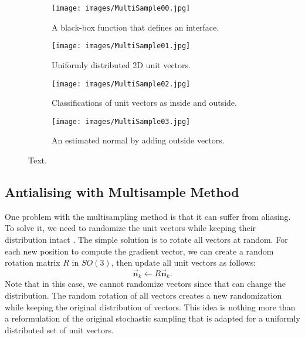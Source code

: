 \documentclass{article}
\begin{document}
\begin{figure}
        \begin{subfigure}[t]{0.23\textwidth}
        \texttt{[image: images/MultiSample00.jpg]}
        \caption{A black-box function that defines an interface. }
        \label{fig_MultiSample00}
    \end{subfigure}
    \hfill
        \begin{subfigure}[t]{0.23\textwidth}
        \texttt{[image: images/MultiSample01.jpg]}
        \caption{Uniformly distributed 2D unit vectors. }
        \label{fig_MultiSample01}
    \end{subfigure}
    \hfill
    \begin{subfigure}[t]{0.23\textwidth}
        \texttt{[image: images/MultiSample02.jpg]}
        \caption{Classifications of unit vectors as inside and outside. }
        \label{fig_MultiSample02}
    \end{subfigure}
    \hfill
        \begin{subfigure}[t]{0.23\textwidth}
        \texttt{[image: images/MultiSample03.jpg]}
        \caption{An estimated normal by adding outside vectors. }
        \label{fig_MultiSample03}
    \end{subfigure}
    \hfill
        \caption{Text.   }
        \label{fig_MultiSample0}
\end{figure}

\subsection{Antialising with Multisample Method} 

One problem with the multisampling method is that it can suffer from aliasing. To solve it, we need to randomize the unit vectors while keeping their distribution intact \cite{cook1984distributed,cook1986stochastic}. The simple solution is to rotate all vectors at random. For each new position to compute the gradient vector, we can create a random rotation matrix $R$ in $SO(3)$, then update all unit vectors as follows: 
\begin{equation} 
\vec{\mathbf{n}}_k  \leftarrow R \vec{\mathbf{n}}_k. \nonumber
\end{equation}
Note that in this case, we cannot randomize vectors since that can change the distribution. The random rotation of all vectors creates a new randomization while keeping the original distribution of vectors. This idea is nothing more than a reformulation of the original stochastic sampling \cite{cook1984distributed,cook1986stochastic} that is adapted for a uniformly distributed set of unit vectors. 
\end{document}
